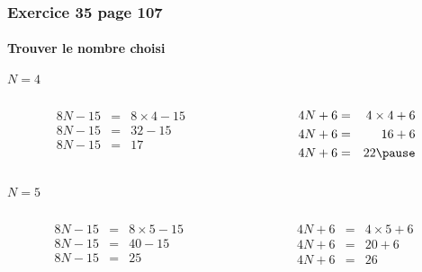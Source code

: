 \documentclass[xcolor={dvipsnames}]{beamer}
\begin{document}
\begin{frame}
	\frametitle{Exercice 35 page 107}
	\framesubtitle{Trouver le nombre choisi}
	
	\begin{block}{$N = 4$}
		
		\begin{columns}
			\begin{column}{0.5\textwidth}
				\begin{eqnarray*}
					8N - 15 &=&  8 \times 4 - 15 \\ 
					8N - 15 &=& 32 - 15 \\ 
					8N - 15 &=& 17 
				\end{eqnarray*}
			\end{column}
			
			
			\begin{column}{0.5\textwidth}
				\begin{eqnarray*}
					4N + 6 &=&  4 \times 4 + 6 \\ 
					4N + 6 &=& 16 + 6 \\ 
					4N + 6 &=& 22 \pause
				\end{eqnarray*}
			\end{column}
		\end{columns}
		
	\end{block}


	\begin{block}{$N = 5$}
		
		\begin{columns}
			\begin{column}{0.5\textwidth}
				\begin{eqnarray*}
					8N - 15 &=&  8 \times 5 - 15 \\ 
					8N - 15 &=& 40 - 15 \\ 
					8N - 15 &=& 25 
				\end{eqnarray*}
			\end{column}
			
			
			\begin{column}{0.5\textwidth}
				\begin{eqnarray*}
					4N + 6 &=&  4 \times 5 + 6 \\ 
					4N + 6 &=& 20 + 6 \\ 
					4N + 6 &=& 26 
				\end{eqnarray*}
			\end{column}
		\end{columns}
		
	\end{block}

\end{frame}
\end{document}

